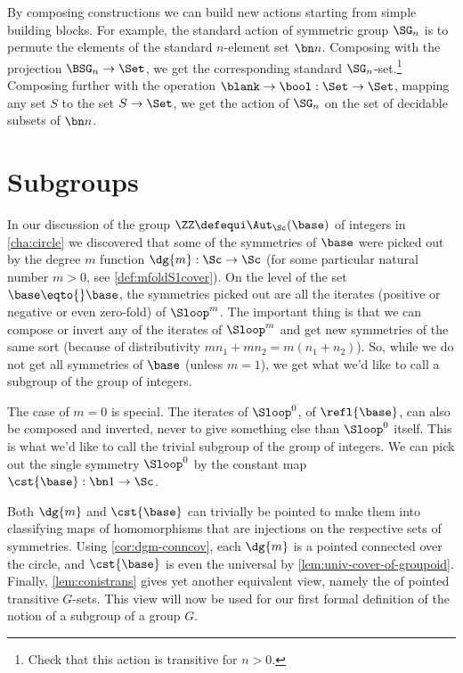 \begin{example}
  By composing constructions we can build new actions
  starting from simple building blocks.
  For example, the standard action of symmetric group $\SG_n$
  is to permute the elements of the standard $n$-element set $\bn n$.
  Composing with the projection $\BSG_n \to \Set$,
  we get the corresponding standard $\SG_n$-set.\footnote{%
    Check that this action is transitive for $n>0$.}
  Composing further with the operation $\blank \to \bool : \Set \to \Set$,
  mapping any set $S$ to the set $S\to\Set$,
  we get the action of $\SG_n$ on the set of decidable subsets of $\bn n$.
\end{example}

\section{Subgroups}
\label{sec:subgroups}
In our discussion of the group $\ZZ\defequi\Aut_{\Sc}(\base)$ of integers
in \cref{cha:circle} we discovered that some of the symmetries of $\base$
were picked out by the degree $m$ function $\dg{m}: \Sc\to\Sc$
(for some particular natural number $m>0$, see \cref{def:mfoldS1cover}).  
On the level of the set $\base\eqto{}\base$, the symmetries picked out are
all the iterates (positive or negative or even zero-fold) of $\Sloop^m$.
The important thing is that we can compose or invert any of the iterates
of $\Sloop^m$ and get new symmetries of the same sort (because of
distributivity $mn_1+mn_2=m(n_1+n_2)$). So, while we do not get all
symmetries of $\base$ (unless $m=1$), we get what we'd like to call 
a subgroup of the group of integers.

The case of $m=0$ is special. The iterates of $\Sloop^0$, \ie of
$\refl{\base}$, can also be composed and inverted, never to give
something else than $\Sloop^0$ itself. This is what we'd like to call
the trivial subgroup of the group of integers. 
We can pick out the single symmetry $\Sloop^0$
by the constant map $\cst{\base} : \bn 1 \to \Sc$.

Both $\dg{m}$ and $\cst{\base}$ can trivially be pointed to make them
into classifying maps of homomorphisms that are injections on the
respective sets of symmetries. Using \cref{cor:dgm-conncov},
each $\dg{m}$ is a pointed connected \covering over the circle, and
$\cst{\base}$ is even the universal \covering by 
\cref{lem:univ-cover-of-groupoid}. Finally, \cref{lem:conistrans}
gives yet another equivalent view, namely the of pointed transitive
$G$-sets. This view will now be used for our first formal definition
of the notion of a subgroup of a group $G$.

